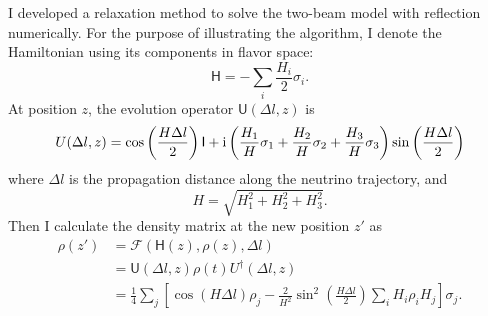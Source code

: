 I developed a relaxation method to solve the two-beam model with reflection numerically. For the purpose of illustrating the algorithm, I denote the Hamiltonian using its components in flavor space:
\begin{equation}
\mathsf H = -\sum_i \frac{H_i}{2}\sigma_i.
\end{equation}
At position $z$, the evolution operator $\mathsf U(\Delta l,z)$ is
\begin{align}
    U(\Delta l, z) = \cos \left( \frac{H \Delta l}{2} \right) \mathsf I + \mathrm{i} \left( \frac{H_1}{H}  \sigma_1 + \frac{H_2}{H} \sigma_2 + \frac{H_3}{H} \sigma_3 \right) \sin \left( \frac{H \Delta l}{2} \right)
\end{align}
where $\Delta l$ is the propagation distance along the neutrino trajectory, and
\begin{equation}
    H = \sqrt{ H_1^2 + H_2^2 + H_3^2 }.
\end{equation}
Then I calculate the density matrix at the new position $z'$ as
\begin{align}
    \rho ( z' ) &= \mathscr F ( \mathsf H(z), \rho(z), \Delta l ) \\
     &= \mathsf U (\Delta l, z) \rho(t)U^\dagger (\Delta l, z) \\
    & = \frac{1}{4} \sum_j \left[  \cos( H \Delta l) \rho_j - \frac{2}{H^2} \sin^2 \left( \frac{H \Delta l}{2} \right)  \sum_i H_i \rho_i H_j  \right] \sigma_j.
\end{align}
